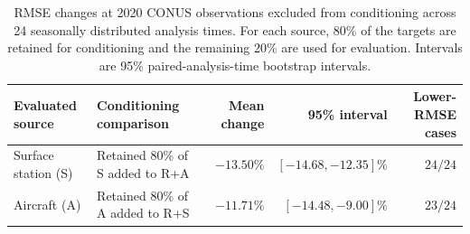 \begin{table}[tbp]
\centering
\caption{RMSE changes at 2020 CONUS observations excluded from conditioning
across 24 seasonally distributed analysis times. For each source, 80\% of the targets
are retained for conditioning and the remaining 20\% are used for evaluation.
Intervals are 95\% paired-analysis-time bootstrap intervals.}
\label{tab:holdout_matched_marginal}
\small
\setlength{\tabcolsep}{5pt}
\renewcommand{\arraystretch}{1.18}
\begin{tabularx}{\textwidth}{@{}l>{\raggedright\arraybackslash}Xrrr@{}}
\toprule
Evaluated source & Conditioning comparison & Mean change & 95\% interval &
Lower-RMSE cases \\
\midrule
Surface station (S) & Retained 80\% of S added to R+A &
$-13.50\%$ & $[-14.68,-12.35]\%$ & $24/24$ \\
Aircraft (A) & Retained 80\% of A added to R+S &
$-11.71\%$ & $[-14.48,-9.00]\%$ & $23/24$ \\
\bottomrule
\end{tabularx}
\end{table}
